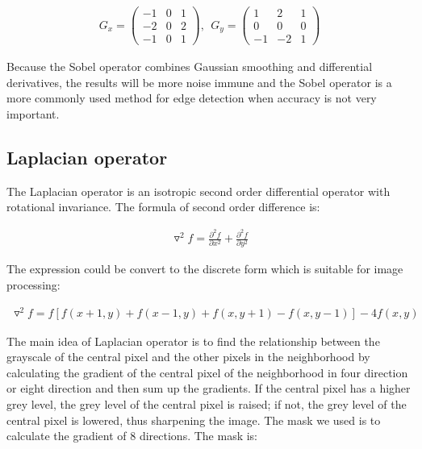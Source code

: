 \documentclass[hyperref]{article}
\theoremstyle{nonumberplain}
\begin{document}
	\begin{equation}
	\begin{aligned}
	G_{x}=\begin{pmatrix}
	-1 &0  &1 \\ 
	-2 &0  &2 \\ 
	-1 &0  &1 
	\end{pmatrix}, \ \ G_{y}=\begin{pmatrix}
	1 &2  &1 \\ 
	0 &0  &0 \\ 
	-1 &-2  &1 
	\end{pmatrix}
	\end{aligned}
	\label{eq17}
	\end{equation}
	
	Because the Sobel operator combines Gaussian smoothing and differential derivatives, the results will be more noise immune and the Sobel operator is a more commonly used method for edge detection when accuracy is not very important.
	
	\subsection{Laplacian operator}
	
	\hspace{1.0em}
	The Laplacian operator is an isotropic second order differential operator with rotational invariance. 
	The formula of second order difference is:
	
	\begin{equation}
	\begin{aligned}
	\triangledown^{2} f= \frac{\partial^{2} f}{\partial x^{2}}+\frac{\partial^{2} f}{\partial y^{2}}
	\end{aligned}
	\label{eq18}
	\end{equation}
	
	The expression could be convert to the discrete form which is suitable for image processing:
	
	\begin{equation}
	\begin{aligned}
	\triangledown^{2} f=f[f(x+1,y)+f(x-1,y)+f(x,y+1)-f(x,y-1)]-4f(x,y)
	\end{aligned}
	\label{eq19}
	\end{equation}
	
	The main idea of Laplacian operator is to find the relationship between the grayscale of the central pixel and the other pixels in the neighborhood by calculating the gradient of the central pixel of the neighborhood in four direction or eight direction and then sum up the gradients. If the central pixel has a higher grey level, the grey level of the central pixel is raised; if not, the grey level of the central pixel is lowered, thus sharpening the image. The mask we used is to calculate the gradient of 8 directions. The mask is:
	
\end{document}
